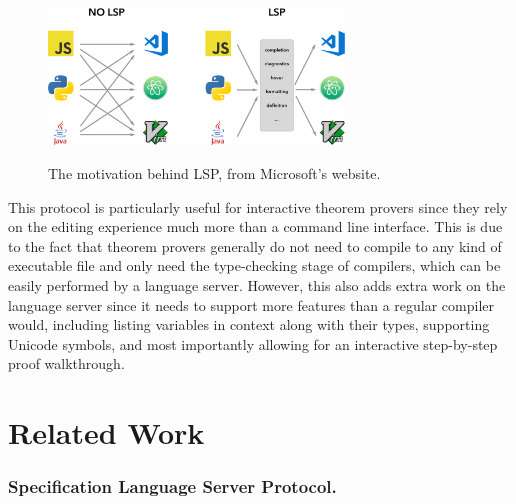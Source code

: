 \begin{figure}
  \centering
  \includegraphics[width=0.7\textwidth]{figs/LSP-MxN.png}
  \label{figure:lsp}
  \caption{
    The motivation behind LSP, from Microsoft's website.
    \protect\footnotemark
  }
\end{figure}

This protocol is particularly useful for interactive theorem provers since
they rely on the editing experience much more than a command line interface.
This is due to the fact that theorem provers generally do not need to compile
to any kind of executable file and only need the type-checking stage of compilers,
which can be easily performed by a language server. However, this also adds extra work
on the language server since it needs to support more features than a regular compiler would,
including listing variables in context along with their types, supporting Unicode symbols,
and most importantly allowing for an interactive step-by-step proof walkthrough.

\section{Related Work}


\subsubsection{Specification Language Server Protocol.}

